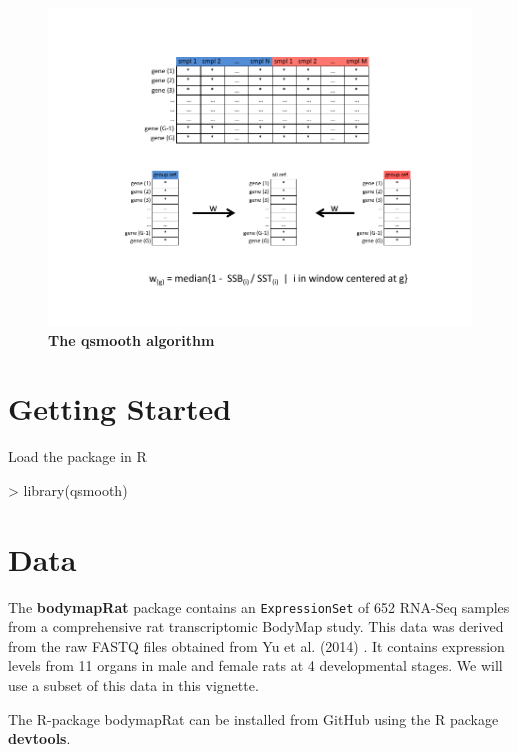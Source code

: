 \documentclass{article}
\begin{document}
\begin{figure}[!h]
\begin{center}
\includegraphics[width=\columnwidth]{qsmooth_algo.pdf}
\end{center}
\small\normalsize
\caption[qsmooth algorithm]
         {{\bf The qsmooth algorithm}}
\label{algo}
\end{figure}


\section{Getting Started}

Load the package in R
\begin{Schunk}
\begin{Sinput}
> library(qsmooth)
\end{Sinput}
\end{Schunk}


\section{Data}

The \textbf{bodymapRat} package contains an
\texttt{ExpressionSet} of 652 RNA-Seq samples from a comprehensive
rat transcriptomic BodyMap study. This data was derived from
the raw FASTQ files obtained from Yu et al. (2014) \cite{Yu2014}.
It contains expression levels from 11 organs in male and female
rats at 4 developmental stages. We will use a subset of this
data in this vignette.

The R-package bodymapRat can be installed from GitHub using the R package
\textbf{devtools}.
\end{document}
